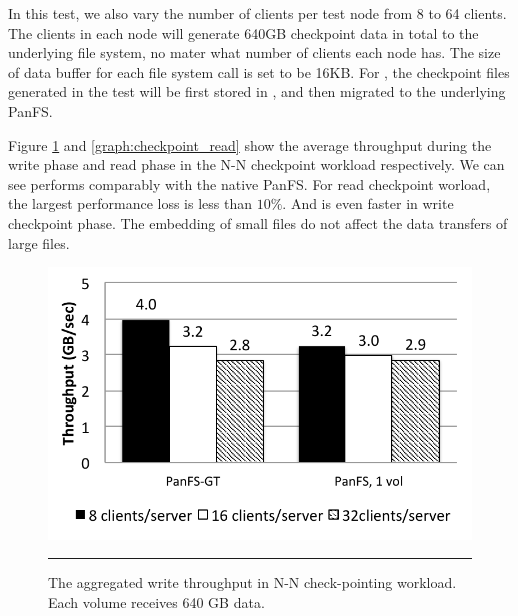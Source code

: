 In this test, we also vary the number of clients per test node
from 8 to 64 clients. The clients in each node will generate
640GB checkpoint data in total to the underlying file system,
no mater what number of clients each node has.
The size of data buffer for each file system call is set to be 16KB.
For \psys, the checkpoint files generated in the test will be
first stored in \tfs, and then migrated to the underlying PanFS.

Figure \ref{graph:checkpoint_write} and \ref{graph:checkpoint_read}
show the average throughput during the write phase and read phase
in the N-N checkpoint workload respectively. We can see \psys
performs comparably with the native PanFS.
For read checkpoint worload, the largest performance loss is less than $10\%$.
And \psys is even faster in write checkpoint phase.
The embedding of small files do not affect the data transfers
of large files.

\begin{figure}[t]  %
\centerline{\includegraphics[scale=0.7]{./figs/checkpointing_write}}
\vspace{10pt}
\caption{\footnotesize
\textsf{
The aggregated write throughput in N-N check-pointing workload.
Each volume receives 640 GB data.
}
}
\hrule
\label{graph:checkpoint_write}
\end{figure}       %

